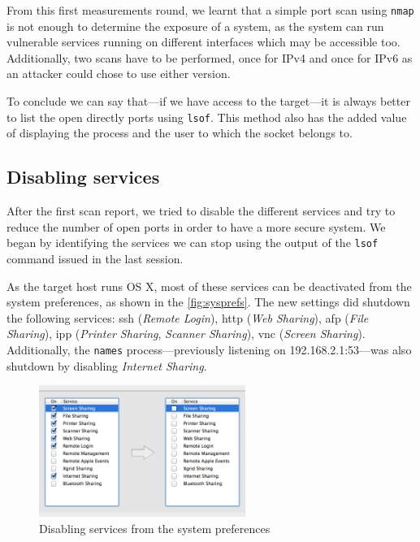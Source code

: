 \documentclass[10pt,a4paper,twoside,onecolumn]{article}
\begin{document}
From this first measurements round, we learnt that a simple port scan using \texttt{nmap} is not enough to determine the exposure of a system, as the system can run vulnerable services running on different interfaces which may be accessible too. Additionally, two scans have to be performed, once for IPv4 and once for IPv6 as an attacker could chose to use either version.

To conclude we can say that---if we have access to the target---it is always better to list the open directly ports using \texttt{lsof}. This method also has the added value of displaying the process and the user to which the socket belongs to.

\subsection{Disabling services}

After the first scan report, we tried to disable the different services and try to reduce the number of open ports in order to have a more secure system. We began by identifying the services we can stop using the output of the \texttt{lsof} command issued in the last session.

As the target host runs OS X, most of these services can be deactivated from the system preferences, as shown in the \autoref{fig:sysprefs}. The new settings did shutdown the following services: ssh (\emph{Remote Login}), http (\emph{Web Sharing}), afp (\emph{File Sharing}), ipp (\emph{Printer Sharing}, \emph{Scanner Sharing}), vnc (\emph{Screen Sharing}). Additionally, the \texttt{names} process---previously listening on 192.168.2.1:53---was also shutdown by disabling \emph{Internet Sharing}.

\begin{figure}[ht]
	\centering
	\includegraphics[width=0.6\textwidth]{images/sysprefs}
	\caption{Disabling services from the system preferences}
	\label{fig:sysprefs}
\end{figure}
\end{document}
